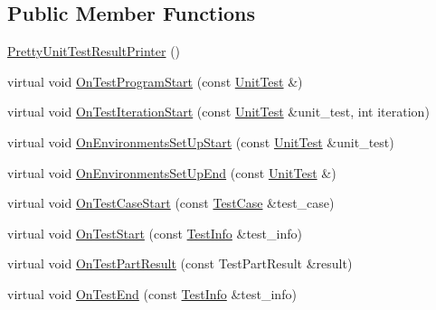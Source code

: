 \subsection*{Public Member Functions}
\begin{DoxyCompactItemize}
\item 
\mbox{\hyperlink{classtesting_1_1internal_1_1PrettyUnitTestResultPrinter_a9219a4263ef0057c98a2a2a41f35ee15}{Pretty\+Unit\+Test\+Result\+Printer}} ()
\item 
virtual void \mbox{\hyperlink{classtesting_1_1internal_1_1PrettyUnitTestResultPrinter_a7a6b6de195b4ef3c9f2edd2e6c270f3e}{On\+Test\+Program\+Start}} (const \mbox{\hyperlink{classtesting_1_1UnitTest}{Unit\+Test}} \&)
\item 
virtual void \mbox{\hyperlink{classtesting_1_1internal_1_1PrettyUnitTestResultPrinter_abdba10a8c97e272ab4cee97cb652c957}{On\+Test\+Iteration\+Start}} (const \mbox{\hyperlink{classtesting_1_1UnitTest}{Unit\+Test}} \&unit\+\_\+test, int iteration)
\item 
virtual void \mbox{\hyperlink{classtesting_1_1internal_1_1PrettyUnitTestResultPrinter_a846a5e82b421e04fcdd2b1b2b64b162f}{On\+Environments\+Set\+Up\+Start}} (const \mbox{\hyperlink{classtesting_1_1UnitTest}{Unit\+Test}} \&unit\+\_\+test)
\item 
virtual void \mbox{\hyperlink{classtesting_1_1internal_1_1PrettyUnitTestResultPrinter_aadba892f02606a8b0c5f5982b3553aac}{On\+Environments\+Set\+Up\+End}} (const \mbox{\hyperlink{classtesting_1_1UnitTest}{Unit\+Test}} \&)
\item 
virtual void \mbox{\hyperlink{classtesting_1_1internal_1_1PrettyUnitTestResultPrinter_adcb68c729565d4bcdf8418a52902c3de}{On\+Test\+Case\+Start}} (const \mbox{\hyperlink{classtesting_1_1TestCase}{Test\+Case}} \&test\+\_\+case)
\item 
virtual void \mbox{\hyperlink{classtesting_1_1internal_1_1PrettyUnitTestResultPrinter_a5078ee71cfa97e37ae7a9366149195c5}{On\+Test\+Start}} (const \mbox{\hyperlink{classtesting_1_1TestInfo}{Test\+Info}} \&test\+\_\+info)
\item 
virtual void \mbox{\hyperlink{classtesting_1_1internal_1_1PrettyUnitTestResultPrinter_a7589e8df7485349498a3a81bf16e2f68}{On\+Test\+Part\+Result}} (const Test\+Part\+Result \&result)
\item 
virtual void \mbox{\hyperlink{classtesting_1_1internal_1_1PrettyUnitTestResultPrinter_a06749ff2b32a16c127374ecd015f13e0}{On\+Test\+End}} (const \mbox{\hyperlink{classtesting_1_1TestInfo}{Test\+Info}} \&test\+\_\+info)

\end{DoxyCompactItemize}
